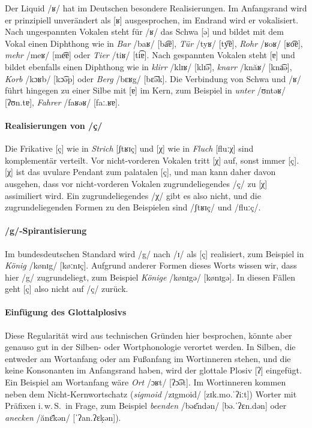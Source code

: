 Der Liquid /ʁ/ hat im Deutschen besondere Realisierungen.
Im Anfangsrand wird er prinzipiell unverändert als [ʁ] ausgesprochen, im Endrand wird er vokalisiert.
Nach ungespannten Vokalen steht für /ʁ/ das Schwa [ə] und bildet mit dem Vokal einen Diphthong wie in \textit{Bar} /baʁ/ [ba͡ɐ], \textit{Tür} /tyʁ/ [ty͡ɐ], \textit{Rohr} /ʁoʁ/ [ʁo͡ɐ], \textit{mehr} /meʁ/ [me͡ɐ] oder \textit{Tier} /tiʁ/ [ti͡ɐ].
Nach gespannten Vokalen steht [ɐ] und bildet ebenfalls einen Diphthong wie in \textit{klirr} /klɪʁ/ [klɪ͡ə], \textit{knarr} /knăʁ/ [kna͡ə], \textit{Korb} /kɔʁb/ [kɔ͡əp] oder \textit{Berg} /bɛʁg/ [bɛ͡ək].
Die Verbindung von Schwa und /ʁ/ führt hingegen zu einer Silbe mit [ɐ] im Kern, zum Beispiel in \textit{unter} /ʊntəʁ/ [ʔʊn.tɐ], \textit{Fahrer} /faʁəʁ/ [faː.ʁɐ].

\paragraph*{Realisierungen von /ç/}

Die Frikative [ç] wie in \textit{Strich} [ʃtʁɪç] und [χ] wie in \textit{Fluch} [fluːχ] sind komplementär verteilt.
Vor nicht-vorderen Vokalen tritt [χ] auf, sonst immer [ç].
[χ] ist das uvulare Pendant zum palatalen [ç], und man kann daher davon ausgehen, dass vor nicht-vorderen Vokalen zugrundeliegendes /ç/ zu [χ] assimiliert wird.
Ein zugrundeliegendes /χ/ gibt es also nicht, und die zugrundeliegenden Formen zu den Beispielen sind /ʃtʁɪç/ und /fluːç/.

\paragraph*{/g/-Spirantisierung}

Im bundesdeutschen Standard wird /g/ nach /ɪ/ als [ç] realisiert, zum Beispiel in \textit{König} /kønɪg/ [køːnɪç].
Aufgrund anderer Formen dieses Worts wissen wir, dass hier /g/ zugrundeliegt, zum Beispiel \textit{Könige} /kønɪgə/ [kønɪgə].
In diesen Fällen geht [ç] also nicht auf /ç/ zurück.

\paragraph*{Einfügung des Glottalplosivs}

Diese Regularität wird aus technischen Gründen hier besprochen, könnte aber genauso gut in der Silben- oder Wortphonologie verortet werden.
In Silben, die entweder am Wortanfang oder am Fußanfang im Wortinneren stehen, und die keine Konsonanten im Anfangsrand haben, wird der glottale Plosiv [ʔ] eingefügt.
Ein Beispiel am Wortanfang wäre \textit{Ort} /ɔʁt/ [ʔɔ͡ət].
Im Wortinneren kommen neben dem Nicht-Kernwortschatz (\textit{sigmoid} /zɪgmoid/ [zɪk.mo.ˈʔiːt]) Worter mit Präfixen i.\,w.\,S.\ in Frage, zum Beispiel \textit{beenden} /bəɛ̆ndən/ [bə.ˈʔɛn.dən] oder \textit{anecken} /ănɛ̆kən/ [ˈʔan.ʔɛḳən]).

